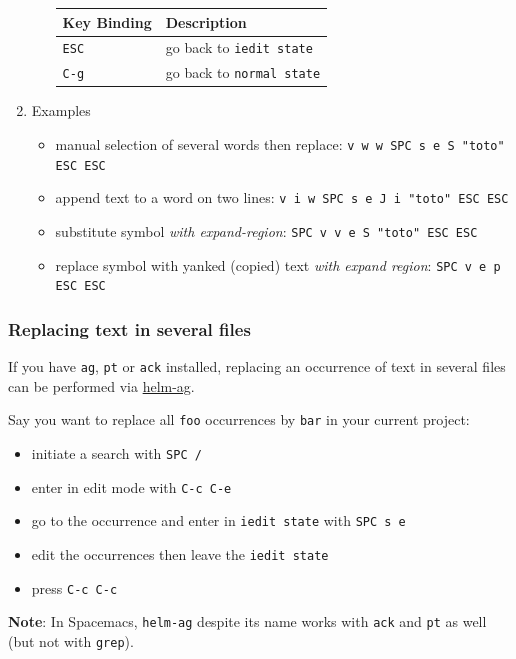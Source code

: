 \documentclass[11pt]{article}
\begin{document}
\begin{enumerate}
\begin{enumerate}
\begin{center}
\begin{tabular}{ll}
Key Binding & Description\\
\hline
\texttt{ESC} & go back to \texttt{iedit state}\\
\texttt{C-g} & go back to \texttt{normal state}\\
\end{tabular}
\end{center}
\end{enumerate}

\item Examples
\label{sec:org8b40156}
\begin{itemize}
\item manual selection of several words then replace: \texttt{v w w SPC s e S "toto" ESC ESC}
\item append text to a word on two lines: \texttt{v i w SPC s e J i "toto" ESC ESC}
\item substitute symbol \emph{with expand-region}: \texttt{SPC v v e S "toto" ESC ESC}
\item replace symbol with yanked (copied) text \emph{with expand region}: \texttt{SPC v
   e p ESC ESC}
\end{itemize}
\end{enumerate}

\subsubsection{Replacing text in several files}
\label{sec:org76b4772}
If you have \texttt{ag}, \texttt{pt} or \texttt{ack} installed, replacing an occurrence of text in
several files can be performed via \href{https://github.com/syohex/emacs-helm-ag}{helm-ag}.

Say you want to replace all \texttt{foo} occurrences by \texttt{bar} in your current
project:
\begin{itemize}
\item initiate a search with \texttt{SPC /}
\item enter in edit mode with \texttt{C-c C-e}
\item go to the occurrence and enter in \texttt{iedit state} with \texttt{SPC s e}
\item edit the occurrences then leave the \texttt{iedit state}
\item press \texttt{C-c C-c}
\end{itemize}

\textbf{Note}: In Spacemacs, \texttt{helm-ag} despite its name works with \texttt{ack} and \texttt{pt} as
well (but not with \texttt{grep}).
\end{document}
